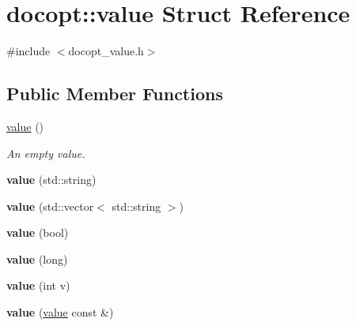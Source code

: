 \hypertarget{structdocopt_1_1value}{}\section{docopt\+:\+:value Struct Reference}
\label{structdocopt_1_1value}


{\ttfamily \#include $<$docopt\+\_\+value.\+h$>$}

\subsection*{Public Member Functions}
\begin{DoxyCompactItemize}
\item 
\mbox{\label{structdocopt_1_1value_ab768a11740f6c251ed6207093f6dc066}} 
\hyperlink{structdocopt_1_1value_ab768a11740f6c251ed6207093f6dc066}{value} ()
\begin{DoxyCompactList}\small\item\em An empty value. \end{DoxyCompactList}\item 
\mbox{\label{structdocopt_1_1value_a35d519b82e27b7fe3aa008c046420204}} 
{\bfseries value} (std\+::string)
\item 
\mbox{\label{structdocopt_1_1value_a32dd6b7ac476b3a8b0a89bfb953f92dd}} 
{\bfseries value} (std\+::vector$<$ std\+::string $>$)
\item 
\mbox{\label{structdocopt_1_1value_ad86d6c1758e50c3d7717d182b14d87e4}} 
{\bfseries value} (bool)
\item 
\mbox{\label{structdocopt_1_1value_a81883678cad49edea2992cea86397c02}} 
{\bfseries value} (long)
\item 
\mbox{\label{structdocopt_1_1value_a39ece19eb013dfba4df75137a8c0781d}} 
{\bfseries value} (int v)
\item 
\mbox{\label{structdocopt_1_1value_ad08e1a856e3e086edeaccc3dddb94fde}} 
{\bfseries value} (\hyperlink{structdocopt_1_1value}{value} const \&)
\item 
\mbox{\label{structdocopt_1_1value_ac3710804ae623fa0e524c23524cc765c}} 

\end{DoxyCompactItemize}
